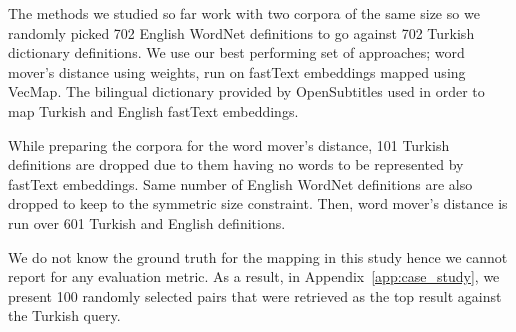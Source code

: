 The methods we studied so far work with two corpora of the same size so we randomly picked 702 English WordNet definitions to go against 702 Turkish dictionary definitions.
We use our best performing set of approaches; word mover's distance using \tfidf{} weights, run on fastText embeddings mapped using VecMap.
The bilingual dictionary provided by OpenSubtitles used in order to map Turkish and English fastText embeddings.

While preparing the corpora for the word mover's distance, 101 Turkish definitions are dropped due to them having no words to be represented by fastText embeddings.
Same number of English WordNet definitions are also dropped to keep to the symmetric size constraint.
Then, word mover's distance is run over 601 Turkish and English definitions.

We do not know the ground truth for the mapping in this study hence we cannot report for any evaluation metric.
As a result, in Appendix~\ref{app:case_study}, we present 100 randomly selected pairs that were retrieved as the top result against the Turkish query.
